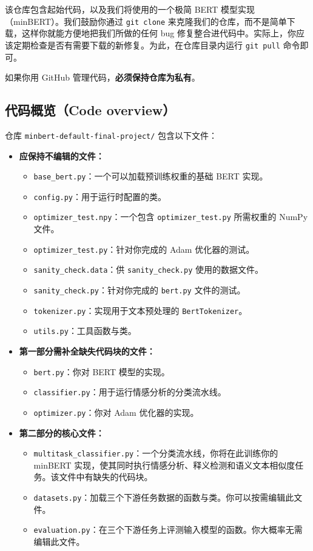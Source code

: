 \documentclass[11pt]{article}
\begin{document}
该仓库包含起始代码，以及我们将使用的一个极简 BERT 模型实现（minBERT）。我们鼓励你通过 \texttt{git clone} 来克隆我们的仓库，而不是简单下载，这样你就能方便地把我们所做的任何 bug 修复整合进代码中。实际上，你应该定期检查是否有需要下载的新修复。为此，在仓库目录内运行 \texttt{git pull} 命令即可。

如果你用 GitHub 管理代码，\textbf{必须保持仓库为私有}。

\subsection{代码概览（Code overview）}

仓库 \texttt{minbert-default-final-project/} 包含以下文件：

\begin{itemize}[leftmargin=1.5em]
  \item \textbf{应保持不编辑的文件：}
    \begin{itemize}
      \item \texttt{base\_bert.py}：一个可以加载预训练权重的基础 BERT 实现。
      \item \texttt{config.py}：用于运行时配置的类。
      \item \texttt{optimizer\_test.npy}：一个包含 \texttt{optimizer\_test.py} 所需权重的 NumPy 文件。
      \item \texttt{optimizer\_test.py}：针对你完成的 Adam 优化器的测试。
      \item \texttt{sanity\_check.data}：供 \texttt{sanity\_check.py} 使用的数据文件。
      \item \texttt{sanity\_check.py}：针对你完成的 \texttt{bert.py} 文件的测试。
      \item \texttt{tokenizer.py}：实现用于文本预处理的 \texttt{BertTokenizer}。
      \item \texttt{utils.py}：工具函数与类。
    \end{itemize}
  \item \textbf{第一部分需补全缺失代码块的文件：}
    \begin{itemize}
      \item \texttt{bert.py}：你对 BERT 模型的实现。
      \item \texttt{classifier.py}：用于运行情感分析的分类流水线。
      \item \texttt{optimizer.py}：你对 Adam 优化器的实现。
    \end{itemize}
  \item \textbf{第二部分的核心文件：}
    \begin{itemize}
      \item \texttt{multitask\_classifier.py}：一个分类流水线，你将在此训练你的 minBERT 实现，使其同时执行情感分析、释义检测和语义文本相似度任务。该文件中有缺失的代码块。
      \item \texttt{datasets.py}：加载三个下游任务数据的函数与类。你可以按需编辑此文件。
      \item \texttt{evaluation.py}：在三个下游任务上评测输入模型的函数。你大概率无需编辑此文件。
    \end{itemize}
\end{itemize}
\end{document}
